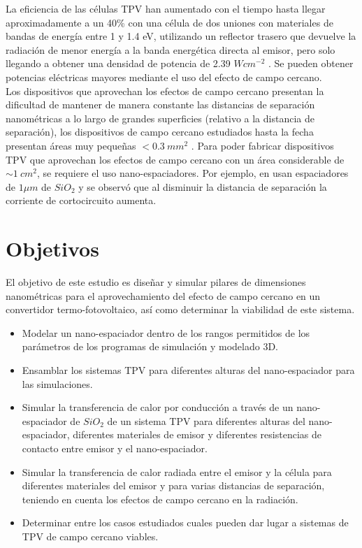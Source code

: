 La eficiencia de las células TPV han aumentado con el tiempo hasta llegar aproximadamente a un 40\% con una célula de dos uniones con materiales de bandas de energía entre 1 y 1.4 eV, utilizando un reflector trasero que devuelve la radiación de menor energía a la banda energética directa al emisor, pero solo llegando a obtener una densidad de potencia de 2.39 $W{cm}^{-2}$ \cite{ThermalConductivity_SiO2_2018}. Se pueden obtener potencias eléctricas mayores mediante el uso del efecto de campo cercano.\\

Los dispositivos que aprovechan los efectos de campo cercano presentan la dificultad de mantener de manera constante las distancias de separación nanométricas a lo largo de grandes superficies (relativo a la distancia de separación), los dispositivos de campo cercano estudiados hasta la fecha presentan áreas muy pequeñas $<0.3 \ mm^2$ \cite{inoue_one-chip_2019_0_3mm2}. Para poder fabricar dispositivos TPV que aprovechan los efectos de campo cercano con un área considerable de $\sim 1 \ cm^2$, se requiere el uso nano-espaciadores. Por ejemplo, en \cite{doi:MicroGapTPV} usan espaciadores de $1\mu m$ de $SiO_2$ y se observó que al disminuir la distancia de separación la corriente de cortocircuito aumenta.


\section{Objetivos}
El objetivo de este estudio es diseñar y simular pilares de dimensiones nanométricas para el aprovechamiento del efecto de campo cercano en un convertidor termo-fotovoltaico, así como determinar la viabilidad de este sistema. 
\begin{itemize}
	\item Modelar un nano-espaciador dentro de los rangos permitidos de los parámetros de los programas de simulación y modelado 3D.
	\item Ensamblar los sistemas TPV para diferentes alturas del nano-espaciador para las simulaciones.
	\item Simular la transferencia de calor por conducción a través de un nano-espaciador de $SiO_2$ de un sistema TPV para diferentes alturas del nano-espaciador, diferentes materiales de emisor y diferentes resistencias de contacto entre emisor y el nano-espaciador.
	\item Simular la transferencia de calor radiada entre el emisor y la célula para diferentes materiales del emisor y para varias distancias de separación, teniendo en cuenta los efectos de campo cercano en la radiación.
	\item Determinar entre los casos estudiados cuales pueden dar lugar a sistemas de TPV de campo cercano viables.
\end{itemize}

